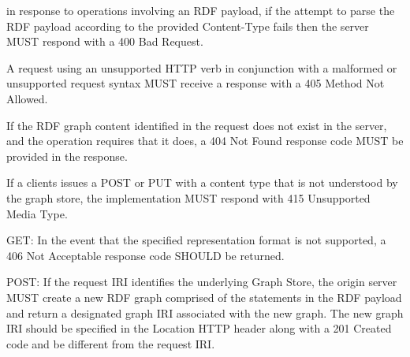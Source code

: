 \documentclass[12pt,letterpaper,draft]{article}
\begin{document}
in response to operations involving an RDF payload, if the attempt to parse the RDF payload according to the provided Content-Type fails then the server MUST respond with a 400 Bad Request.

A request using an unsupported HTTP verb in conjunction with a malformed or unsupported request syntax MUST receive a response with a 405 Method Not Allowed.

If the RDF graph content identified in the request does not exist in the server, and the operation requires that it does, a 404 Not Found response code MUST be provided in the response.

If a clients issues a POST or PUT with a content type that is not understood by the graph store, the implementation MUST respond with 415 Unsupported Media Type.

GET: In the event that the specified representation format is not supported, a 406 Not Acceptable response code SHOULD be returned.

POST: If the request IRI identifies the underlying Graph Store, the origin server MUST create a new RDF graph comprised of the statements in the RDF payload and return a designated graph IRI associated with the new graph. The new graph IRI should be specified in the Location HTTP header along with a 201 Created code and be different from the request IRI.




\printacronyms

\sloppy
\printbibliography[heading=bibnumbered]
\end{document}
